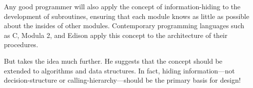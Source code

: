 Any good programmer will also apply the concept of information-hiding to
the development of subroutines, ensuring that each module knows as little
as possible about the insides of other modules. Contemporary programming
languages such as C, Modula 2, and Edison apply this concept to the
architecture of their procedures.

But %
takes the idea much further. He suggests that the concept should be
extended to algorithms and data structures.  In fact, hiding
information---not decision-structure or calling-hierarchy---should be
the primary basis for design!%
%
%
%

